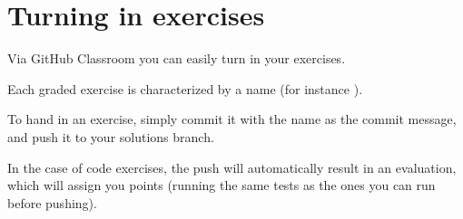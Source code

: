 
\section{Turning in exercises}\label{sec:handin_instructions}

Via GitHub Classroom you can easily turn in your exercises.

Each graded exercise is characterized by a name (for instance ).

To hand in an exercise, simply commit it with the name as the commit message, and push it to your solutions branch.

In the case of code exercises, the push will automatically result in an evaluation, which will assign you points (running the same tests as the ones you can run before pushing).


